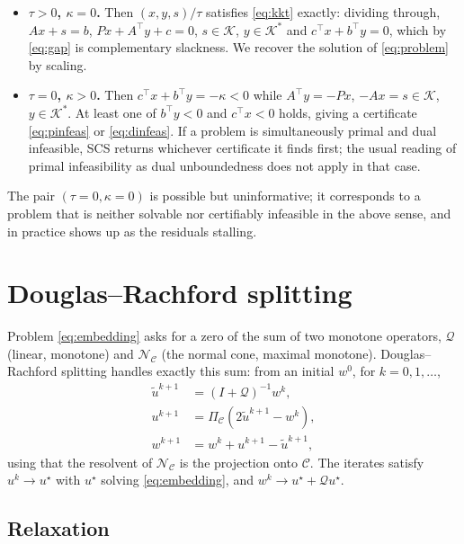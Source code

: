 \documentclass[11pt,a4paper]{article}
\newcommand{\K}{\mathcal{K}}
\newcommand{\C}{\mathcal{C}}
\newcommand{\Q}{\mathcal{Q}}
\newcommand{\N}{\mathcal{N}}
\newcommand{\proj}[1]{\Pi_{#1}}
\newcommand{\tr}{^\top}
\theoremstyle{plain}
\begin{document}
\begin{itemize}
\item \textbf{$\tau > 0$, $\kappa = 0$.} Then $(x, y, s)/\tau$ satisfies
  \eqref{eq:kkt} exactly: dividing through, $Ax + s = b$, $Px + A\tr y + c = 0$,
  $s \in \K$, $y \in \K^*$ and $c\tr x + b\tr y = 0$, which by \eqref{eq:gap}
  is complementary slackness. We recover the solution of \eqref{eq:problem} by
  scaling.
\item \textbf{$\tau = 0$, $\kappa > 0$.} Then $c\tr x + b\tr y = -\kappa < 0$
  while $A\tr y = -Px$, $-Ax = s \in \K$, $y \in \K^*$. At least one of
  $b\tr y < 0$ and $c\tr x < 0$ holds, giving a certificate
  \eqref{eq:pinfeas} or \eqref{eq:dinfeas}. If a problem is simultaneously
  primal and dual infeasible, SCS returns whichever certificate it finds first;
  the usual reading of primal infeasibility as dual unboundedness does not
  apply in that case.
\end{itemize}

The pair $(\tau = 0, \kappa = 0)$ is possible but uninformative; it corresponds
to a problem that is neither solvable nor certifiably infeasible in the above
sense, and in practice shows up as the residuals stalling.

\section{Douglas--Rachford splitting}\label{sec:dr}

Problem \eqref{eq:embedding} asks for a zero of the sum of two monotone
operators, $\Q$ (linear, monotone) and $\N_\C$ (the normal cone, maximal
monotone). Douglas--Rachford splitting \cite{lions:79} handles exactly this
sum: from an initial $w^0$, for $k = 0, 1, \dots$,
\begin{align}\label{eq:dr}
\tilde u^{k+1} &= (I + \Q)^{-1} w^k, \nonumber\\
u^{k+1} &= \proj{\C}\!\left(2\tilde u^{k+1} - w^k\right), \\
w^{k+1} &= w^k + u^{k+1} - \tilde u^{k+1}, \nonumber
\end{align}
using that the resolvent of $\N_\C$ is the projection onto $\C$. The iterates
satisfy $u^k \to u^\star$ with $u^\star$ solving \eqref{eq:embedding}, and
$w^k \to u^\star + \Q u^\star$.

\subsection{Relaxation}
\end{document}
